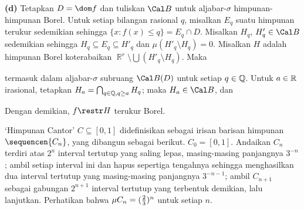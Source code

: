 {\medskip

{\bf (d)} Tetapkan $D=\dom f$ dan tuliskan $\Cal B$ untuk
aljabar-$\sigma$ himpunan-himpunan Borel. Untuk setiap bilangan rasional
$q$, misalkan $E_q$ suatu himpunan terukur sedemikian sehingga
$\{x:f(x)\le q\}=E_q\cap D$. Misalkan $H_q$, $H_q'\in\Cal B$ sedemikian
sehingga $H_q\subseteq E_q\subseteq H'_q$ dan
$\mu(H'_q\setminus H_q)=0$. Misalkan $H$ adalah himpunan Borel
koterabaikan $\BbbR^r\setminus\bigcup(H'_q\setminus H_q)$. Maka


\noindent termasuk dalam aljabar-$\sigma$ subruang $\Cal B(D)$ untuk
setiap $q\in\Bbb Q$. Untuk $a\in\Bbb R$ irasional, tetapkan
$H_a=\bigcap_{q\in\Bbb Q,q\ge a}H_q$; maka $H_a\in\Cal B$, dan


\noindent Dengan demikian, $f\restr H$ terukur Borel.
}%



 `Himpunan Cantor' $C\subseteq[0,1]$ didefinisikan sebagai irisan
barisan himpunan $\sequencen{C_n}$, yang dibangun sebagai
berikut. $C_0=[0,1]$. Andaikan $C_n$ terdiri atas $2^n$ interval tertutup
yang saling lepas, masing-masing panjangnya $3^{-n}$; ambil setiap interval
ini dan hapus sepertiga tengahnya sehingga menghasilkan dua interval tertutup
yang masing-masing panjangnya $3^{-n-1}$; ambil $C_{n+1}$ sebagai gabungan
$2^{n+1}$ interval tertutup yang terbentuk demikian, lalu lanjutkan.
Perhatikan bahwa $\mu C_n=({2\over 3})^n$ untuk setiap $n$.

